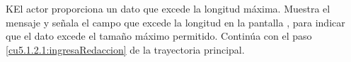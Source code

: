 \begin{UCtrayectoriaA}{K}{El actor proporciona un dato que excede la longitud máxima.}
    \UCpaso[\UCsist] Muestra el mensaje  y señala el campo que excede la 
    longitud en la pantalla , para indicar que el dato excede el tamaño máximo permitido.
    \UCpaso[] Continúa con el paso \ref{cu5.1.2.1:ingresaRedaccion} de la trayectoria principal.
 \end{UCtrayectoriaA}

  